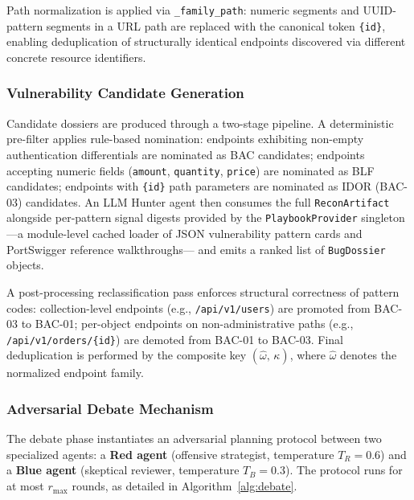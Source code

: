 Path normalization is applied via \texttt{\_family\_path}: numeric
segments and UUID-pattern segments in a URL path are replaced with the
canonical token \texttt{\{id\}}, enabling deduplication of structurally
identical endpoints discovered via different concrete resource
identifiers.

\subsubsection{Vulnerability Candidate Generation}

Candidate dossiers are produced through a two-stage pipeline.
A deterministic pre-filter applies rule-based nomination: endpoints
exhibiting non-empty authentication differentials are nominated as BAC
candidates; endpoints accepting numeric fields (\texttt{amount},
\texttt{quantity}, \texttt{price}) are nominated as BLF candidates;
endpoints with \texttt{\{id\}} path parameters are nominated as IDOR
(BAC-03) candidates.
An LLM Hunter agent then consumes the full \texttt{ReconArtifact}
alongside per-pattern signal digests provided by the
\texttt{PlaybookProvider} singleton---a module-level cached loader of
JSON vulnerability pattern cards and PortSwigger reference walkthroughs---
and emits a ranked list of \texttt{BugDossier} objects.

A post-processing reclassification pass enforces structural
correctness of pattern codes: collection-level endpoints (e.g.,
\texttt{/api/v1/users}) are promoted from BAC-03 to BAC-01;
per-object endpoints on non-administrative paths (e.g.,
\texttt{/api/v1/orders/\{id\}}) are demoted from BAC-01 to BAC-03.
Final deduplication is performed by the composite key
$(\hat{\omega},\, \kappa)$, where $\hat{\omega}$ denotes the normalized
endpoint family.

\subsubsection{Adversarial Debate Mechanism}

The debate phase instantiates an adversarial planning protocol between
two specialized agents: a \textbf{Red agent} (offensive strategist,
temperature $T_R = 0.6$) and a \textbf{Blue agent} (skeptical reviewer,
temperature $T_B = 0.3$).
The protocol runs for at most $r_{\max}$ rounds, as detailed in
Algorithm~\ref{alg:debate}.

